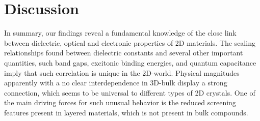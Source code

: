 \documentclass[journal=ancac3,manuscript=article,email=true,hyperref=true,keywords=true]{achemso}
\begin{document}



\section{Discussion}
\label{sec:org621792b}

In summary, our findings reveal a fundamental knowledge of the close link between 
dielectric, optical and electronic properties of 2D materials. The scaling relationships found
between dielectric constants and several other important quantities, such band gaps, 
excitonic binding energies, and quantum capacitance imply that such correlation is unique 
in the 2D-world. Physical magnitudes apparently with a no 
clear interdependence in 3D-bulk display a strong connection, which seems to be universal 
to different types of 2D crystals. One of the main driving 
forces for such unusual behavior is the reduced screening 
features present in layered materials, which is not present 
in bulk compounds. 
\end{document}
